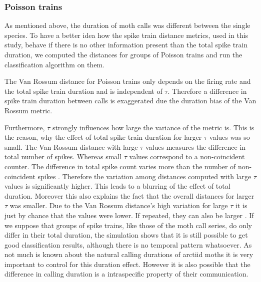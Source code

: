 \documentclass[12pt,a4paper,pdftex]{article}
\begin{document}
\subsubsection*{Poisson trains}
\label{PoissonTrains_Discussion}
As mentioned above, the duration of moth calls was different between the single species. To have a better idea how the spike train distance metrics, used in this study, behave if there is no other information present than the total spike train duration, we computed the distances for groups of Poisson trains and run the classification algorithm on them.

The Van Rossum distance for Poisson trains only depends on the firing rate and the total spike train duration and is independent of $ \tau $. Therefore a difference in spike train duration between calls is exaggerated due the duration bias of the Van Rossum metric. 

Furthermore, $ \tau $ strongly influences how large the variance of the metric is. This is the reason, why the effect of total spike train duration for larger $ \tau $ values was so small. The Van Rossum distance with large $ \tau $ values measures the difference in total number of spikes. Whereas small $ \tau $ values correspond to  a non-coincident counter. The difference in total spike count varies more than the number of non-coincident spikes \cite{rossum2001}. Therefore the variation among distances computed with large $ \tau $ values is significantly higher. This leads to a blurring of the effect of total duration. Moreover this also explains the fact that the overall distances for larger $ \tau $ was smaller. Due to the Van Rossum distance's high variation for large $ \tau $ it is just by chance that the values were lower. If repeated, they can also be larger \cite{rossum2001}. If we suppose that groups of spike trains, like those of the moth call series, do only differ in their total duration, the simulation shows that it is still possible to get good classification results, although there is no temporal pattern whatsoever. As not much is known about the natural calling durations of arctiid moths it is very important to control for this duration effect. However it is also possible that the difference in calling duration is a intraspecific property of their communication. 
\end{document}

